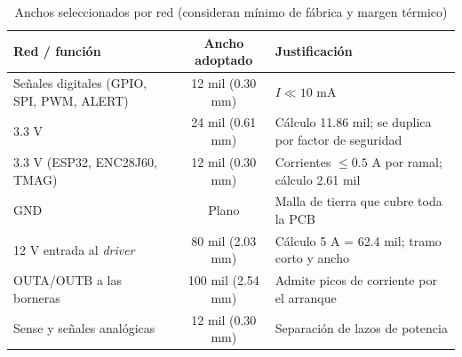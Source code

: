     \begin{table}[H]
    \centering
    \caption{Anchos seleccionados por red (consideran mínimo de fábrica y margen térmico)}
    \label{tab:anchos_pcb}

    \begin{tabular}{|p{4.8cm}|c|p{5.5cm}|}
    \hline
    Red / función & Ancho adoptado & Justificación \\
    \hline
    Señales digitales (GPIO, SPI, PWM, ALERT) & 12 mil (0.30 mm) & $I \ll 10$ mA \\
    \hline
    3.3 V & 24 mil (0.61 mm) & Cálculo 11.86 mil; se duplica por factor de seguridad \\
    \hline
    3.3 V (ESP32, ENC28J60, TMAG) & 12 mil (0.30 mm) & Corrientes $\leq 0.5$ A por ramal; cálculo 2.61 mil \\
    \hline
    GND & Plano & Malla de tierra que cubre toda la \ac{PCB} \\
    \hline
    12 V entrada al \textit{driver} & 80 mil (2.03 mm) & Cálculo 5 A = 62.4 mil; tramo corto y ancho \\
    \hline
    OUTA/OUTB a las borneras & 100 mil (2.54 mm) & Admite picos de corriente por el arranque \\
    \hline
    Sense y señales analógicas & 12 mil (0.30 mm) & Separación de lazos de potencia \\
    \hline
    \end{tabular}
    \end{table}


